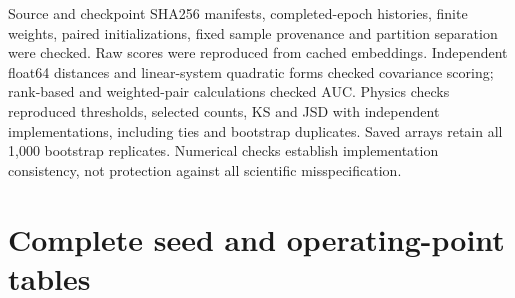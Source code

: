 \documentclass[11pt,a4paper]{article}
\newcommand{\pt}{p_{\mathrm T}}
\begin{document}
Source and checkpoint SHA256 manifests, completed-epoch histories, finite weights,
paired initializations, fixed sample provenance and partition separation were
checked. Raw scores were reproduced from cached embeddings. Independent
float64 distances and linear-system quadratic forms checked covariance scoring;
rank-based and weighted-pair calculations checked AUC. Physics checks reproduced
thresholds, selected counts, KS and JSD with independent implementations, including
ties and bootstrap duplicates. Saved arrays retain all 1,000 bootstrap replicates.
Numerical checks establish implementation consistency, not protection against
all scientific misspecification.

\clearpage
\section{Complete seed and operating-point tables}\label{app:tables}
\begin{table}[htbp]\centering\scriptsize
\resizebox{\linewidth}{!}{}
\caption{All model/scorer seed AUCs. The corresponding CSV preserves numerical
precision. The balanced columns use the restricted common-$\pt$ population.}
\end{table}
\clearpage
\begin{table}[htbp]\centering\scriptsize
\resizebox{\linewidth}{!}{}
\caption{All methods at nominal 10\% background acceptance. Efficiencies are
percentages; model rows show mean $\pm$ seed SD. KS and JSD concern background
jet mass; JSD uses natural logs. Actual acceptance is measured on a disjoint
background assessment sample.}
\end{table}
\begin{table}[htbp]\centering\scriptsize
\resizebox{\linewidth}{!}{}
\caption{As above at nominal 5\%. Full per-seed thresholds, counts, Wilson intervals,
threshold-refitting bootstrap intervals, mass/$\pt$ profiles and paired differences
are supplied in the machine-readable numerical supplement.}
\end{table}
\clearpage

\end{document}
